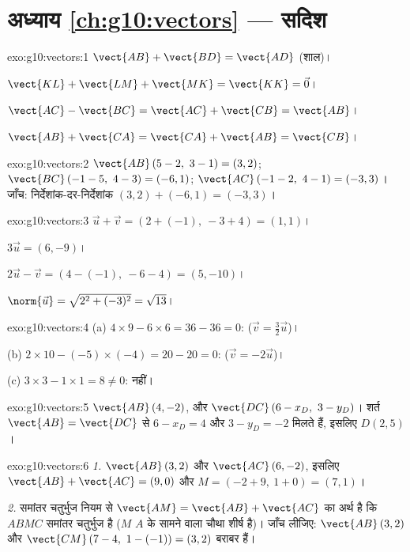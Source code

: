 \section*{अध्याय \ref{ch:g10:vectors} --- सदिश}

\begin{solution}{exo:g10:vectors:1}
$\vect{AB} + \vect{BD} = \vect{AD}$ (शाल)।

$\vect{KL} + \vect{LM} + \vect{MK} = \vect{KK} = \vec 0$।

$\vect{AC} - \vect{BC} = \vect{AC} + \vect{CB} = \vect{AB}$।

$\vect{AB} + \vect{CA} = \vect{CA} + \vect{AB} = \vect{CB}$।
\end{solution}

\begin{solution}{exo:g10:vectors:2}
$\vect{AB}\,(5-2,\ 3-1) = (3, 2)$; \quad
$\vect{BC}\,(-1-5,\ 4-3) = (-6, 1)$; \quad
$\vect{AC}\,(-1-2,\ 4-1) = (-3, 3)$।
जाँच: निर्देशांक-दर-निर्देशांक $(3, 2) + (-6, 1) = (-3, 3)$।
\end{solution}

\begin{solution}{exo:g10:vectors:3}
$\vec u + \vec v = (2 + (-1),\ -3 + 4) = (1, 1)$।

$3\vec u = (6, -9)$।

$2\vec u - \vec v = (4 - (-1),\ -6 - 4) = (5, -10)$।

$\norm{\vec u} = \sqrt{2^2 + (-3)^2} = \sqrt{13}$।
\end{solution}

\begin{solution}{exo:g10:vectors:4}
(a) $4 \times 9 - 6 \times 6 = 36 - 36 = 0$:  ($\vec v = \frac32 \vec u$)।

(b) $2 \times 10 - (-5) \times (-4) = 20 - 20 = 0$:  ($\vec v = -2\vec u$)।

(c) $3 \times 3 - 1 \times 1 = 8 \neq 0$:  नहीं।
\end{solution}

\begin{solution}{exo:g10:vectors:5}
$\vect{AB}\,(4, -2)$, और $\vect{DC}\,(6 - x_D,\ 3 - y_D)$। शर्त $\vect{AB} = \vect{DC}$ से $6 - x_D = 4$ और $3 - y_D = -2$ मिलते हैं, इसलिए $D(2, 5)$।
\end{solution}

\begin{solution}{exo:g10:vectors:6}
\emph{1.} $\vect{AB}\,(3, 2)$ और $\vect{AC}\,(6, -2)$, इसलिए $\vect{AB} + \vect{AC} = (9, 0)$ और $M = (-2 + 9,\ 1 + 0) = (7, 1)$।

\emph{2.} समांतर चतुर्भुज नियम से $\vect{AM} = \vect{AB} + \vect{AC}$ का अर्थ है कि $ABMC$ समांतर चतुर्भुज
है ($M$ $A$ के सामने वाला चौथा शीर्ष है)। जाँच लीजिए: $\vect{AB}\,(3,2)$ और $\vect{CM}\,(7-4,\ 1-(-1)) =
(3, 2)$ बराबर
हैं।
\end{solution}

